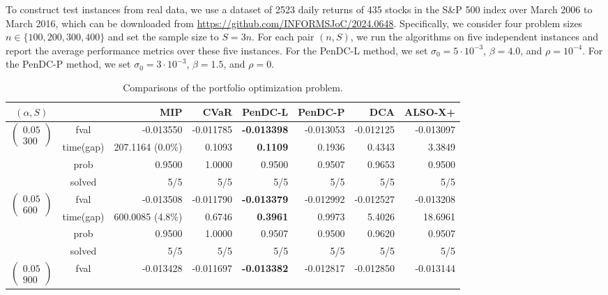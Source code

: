 \documentclass[11pt]{article}
\begin{document}
To construct test instances from real data, we use a dataset of 2523 daily returns of 435 stocks in the S\&P 500 index over March 2006 to March 2016, which can be downloaded from \url{https://github.com/INFORMSJoC/2024.0648}. Specifically, we consider four problem sizes $n\in\{100,200,300,400\}$ and set the sample size to $S=3n$. For each pair $(n,S)$, we run the algorithms on five independent instances and report the average performance metrics over these five instances. For the PenDC-L method, we set $\sigma_0 = 5\cdot 10^{-3}$, $\beta  = 4.0$, and $\rho = 10^{-4}$. For the PenDC-P method, we set $\sigma_0 = 3\cdot 10^{-3}$, $\beta  = 1.5$, and $\rho = 0$. 

\begin{table}[ht!]
\centering
\caption{Comparisons of the portfolio optimization problem.}
\label{tab:portfolio-avg}
\scriptsize
\setlength{\tabcolsep}{3pt}
\renewcommand{\arraystretch}{0.92}
\begin{tabular}{ccrrrrrr}
\toprule
$(\alpha,S)$ & & MIP & CVaR & PenDC-L & PenDC-P & DCA & ALSO-X+\\
\midrule
\multirow{4}{*}{$\left(\begin{array}{c} 0.05 \\ 300 \end{array}\right)$} & fval  & -0.013550 & -0.011785 &\textbf{ -0.013398} & -0.013053 & -0.012125 & -0.013097\\
& time(gap)  & 207.1164 (0.0\%) & 0.1093 & \textbf{0.1109} & 0.1936 & 0.4343 & 3.3849\\
& prob  & 0.9500 & 1.0000 & 0.9500 & 0.9507 & 0.9653 & 0.9500\\
& solved & 5/5 & 5/5 & 5/5 & 5/5 & 5/5 & 5/5\\
\midrule
\multirow{4}{*}{$\left(\begin{array}{c} 0.05 \\ 600 \end{array}\right)$} & fval  & -0.013508 & -0.011790 &\textbf{ -0.013379} & -0.012992 & -0.012527 & -0.013208\\
& time(gap)  & 600.0085 (4.8\%) & 0.6746 & \textbf{0.3961 }& 0.9973 & 5.4026 & 18.6961\\
& prob  & 0.9500 & 1.0000 & 0.9507 & 0.9500 & 0.9620 & 0.9507\\
& solved & 5/5 & 5/5 & 5/5 & 5/5 & 5/5 & 5/5\\
\midrule
\multirow{4}{*}{$\left(\begin{array}{c} 0.05 \\ 900 \end{array}\right)$} & fval  & -0.013428 & -0.011697 &\textbf{ -0.013382} & -0.012817 & -0.012850 & -0.013144\\

\end{tabular}
\end{table}
\end{document}
